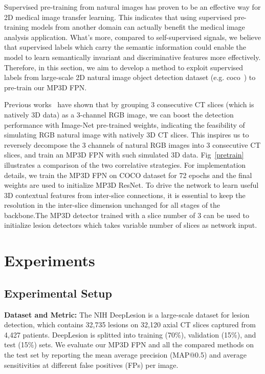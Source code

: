 \documentclass[runningheads]{llncs}
\begin{document}
Supervised pre-training from natural images has proven to be an effective way for 2D medical image transfer learning\cite{3DCE,MSB,Retina,MVP,MULAN, Chest}. This indicates that using supervised pre-training models from another domain can actually benefit the medical image analysis application. 
What's more, compared to self-supervised signals, we believe that supervised labels which carry the semantic information could enable the model to learn semantically invariant and discriminative features more effectively.
Therefore, in this section, we aim to develop a method to exploit supervised labels from large-scale 2D natural image object detection dataset (e.g. coco~\cite{COCO}) to pre-train our MP3D FPN. 


Previous works~\cite{3DCE} have shown that by grouping 3 consecutive CT slices (which is natively 3D data) as a 3-channel RGB image, we can boost the detection performance with Image-Net pre-trained weights, indicating the feasibility of simulating RGB natural image with natively 3D CT slices.
This inspires us to reversely decompose the 3 channels of natural RGB images into 3 consecutive CT slices, and train an MP3D FPN with such simulated 3D data. 
Fig~\ref{pretrain} illustrates a comparison of the two correlative strategies. 
For implementation details, we train the MP3D FPN on COCO dataset for 72 epochs and the final weights are used to initialize MP3D ResNet. 
To drive the network to learn useful 3D contextual features from inter-slice connections, it is essential to keep the resolution in the inter-slice dimension unchanged for all stages of the backbone.The MP3D detector trained with a slice number of 3 can be used to initialize lesion detectors which takes variable number of slices as network input.




\section{Experiments}

\subsection{Experimental Setup}
\noindent\textbf{Dataset and Metric:} The NIH DeepLesion is a large-scale dataset for lesion detection, which contains 32,735 lesions on 32,120 axial CT slices captured from 4,427 patients. DeepLesion is splitted into training (70\%), validation (15\%), and test (15\%) sets. We evaluate our MP3D FPN and all the compared methods on the test set by reporting the mean average precision (MAP@0.5) and average sensitivities at different false positives (FPs) per image.
\end{document}
